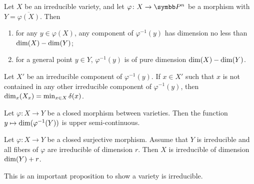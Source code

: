 \begin{corollary}
    Let $X$ be an irreducible variety, and let $\varphi\colon X\to \PP^n$ be a morphism with $Y=\overline{\varphi(X)}$. Then
    \begin{enumerate}
      \item for any $y\in \varphi(X)$, any component of $\varphi^{-1}(y)$ has dimension no less than $\operatorname{dim}(X) - \operatorname{dim}(Y)$;
      \item for a general point $y\in Y$, $\varphi^{-1}(y)$ is of pure dimension $\operatorname{dim}(X)-\operatorname{dim}(Y)$.
    \end{enumerate}
\end{corollary}

Let $X'$ be an irreducible component of $\varphi^{-1}(y)$. If $x\in X'$ such that $x$ is not contained in any other irreducible component of $\varphi^{-1}(y)$, then $\operatorname{dim}_x(X_x)=\operatorname*{min}_{x\in X} \delta(x)$.

\begin{corollary}
    Let $\varphi\colon X\to Y$ be a closed morphism between varieties. Then the function $y\mapsto \operatorname{dim}(\varphi^{-1}(Y))$ is upper semi-continuous.
\end{corollary}

\begin{proposition}
    Let $\varphi\colon X\to Y$ be a closed surjective morphism. Assume that $Y$ is irreducible and all fibers of $\varphi$ are irreducible of dimension $r$. Then $X$ is irreducible of dimension $\operatorname{dim}(Y)+r$.
\end{proposition}

This is an important proposition to show a variety is irreducible.
